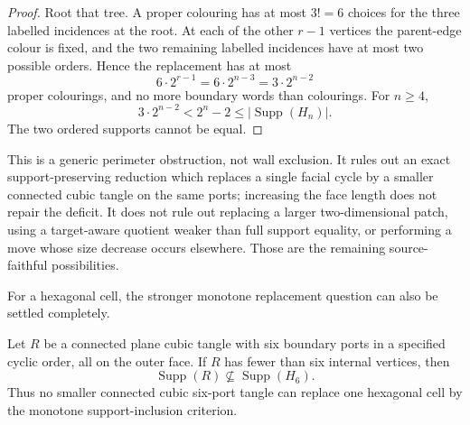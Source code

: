 \begin{proof}
Root that tree.  A proper colouring has at most \(3!=6\) choices for the
three labelled incidences at the root.  At each of the other \(r-1\)
vertices the parent-edge colour is fixed, and the two remaining labelled
incidences have at most two possible orders.  Hence the replacement has at
most
\[
                    6\cdot2^{r-1}=6\cdot2^{n-3}
                    =3\cdot2^{n-2}
\]
proper colourings, and no more boundary words than colourings.  For
\(n\geq4\),
\[
                3\cdot2^{n-2}<2^n-2
                \leq |\operatorname{Supp}(H_n)|.
\]
The two ordered supports cannot be equal.
\end{proof}

This is a generic perimeter obstruction, not wall exclusion.  It rules out
an exact support-preserving reduction which replaces a single facial cycle
by a smaller connected cubic tangle on the same ports; increasing the face
length does not repair the deficit.  It does not rule out replacing a larger
two-dimensional patch, using a target-aware quotient weaker than full
support equality, or performing a move whose size decrease occurs elsewhere.
Those are the remaining source-faithful possibilities.

For a hexagonal cell, the stronger monotone replacement question can also be
settled completely.

\begin{theorem}
\label{thm:hexagon-no-smaller-tree-support}
\Sprose
Let \(R\) be a connected plane cubic tangle with six boundary ports in a
specified cyclic order, all on the outer face.  If \(R\) has fewer than six
internal vertices, then
\[
       \operatorname{Supp}(R)\not\subseteq\operatorname{Supp}(H_6).
\]
Thus no smaller connected cubic six-port tangle can replace one hexagonal
cell by the monotone support-inclusion criterion.
\end{theorem}

